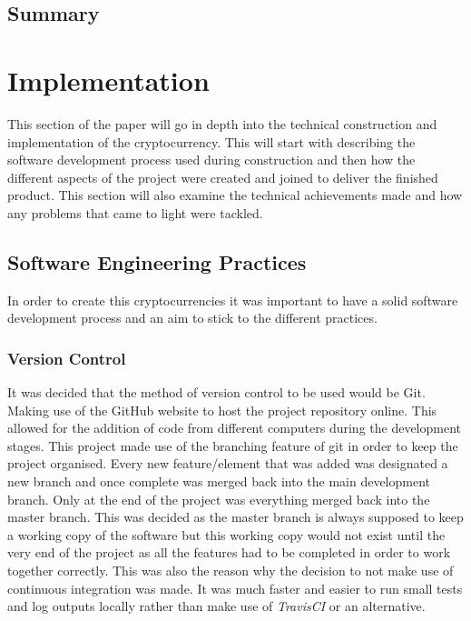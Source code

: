 \documentclass{l4proj}
\begin{document}
\section{Summary}


\chapter{Implementation}
This section of the paper will go in depth into the technical construction and implementation of the cryptocurrency.
This will start with describing the software development process used during construction and then how the different
aspects of the project were created and joined to deliver the finished product. This section will also examine the 
technical achievements made and how any problems that came to light were tackled.


\section{Software Engineering Practices}
In order to create this cryptocurrencies it was important to have a solid software development process and an
aim to stick to the different practices.

\subsection{Version Control}
It was decided that the method of version control to be used would be Git. Making use of the GitHub website to 
host the project repository online. This allowed for the addition of code from different computers during the
development stages. This project made use of the branching feature of git in order to keep the project organised.
Every new feature/element that was added was designated a new branch and once complete was merged back into the
main development branch. Only at the end of the project was everything merged back into the master branch. This
was decided as the master branch is always supposed to keep a working copy of the software but this working copy
would not exist until the very end of the project as all the features had to be completed in order to work together
correctly. This was also the reason why the decision to not make use of continuous integration was made. It was
much faster and easier to run small tests and log outputs locally rather than make use of \textit{TravisCI} or an 
alternative.
\end{document}
